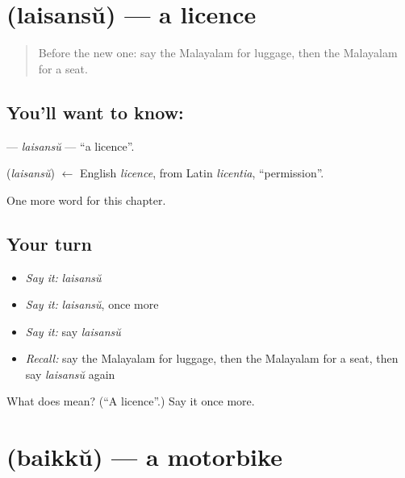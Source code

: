 \section[\texorpdfstring{\ml{ലൈസൻസ്} (laisansŭ)}{ലൈസൻസ് (laisansŭ)}]{ (laisansŭ) — a licence}

\label{lesson:ML-C210-laisansu}



\begin{quote}
Before the new one: say the Malayalam for luggage, then the Malayalam for a seat.
\end{quote}

\subsection*{You'll want to know: }
\textbf{} — \emph{laisansŭ} — \textquotedblleft{}a licence\textquotedblright{}.

\begin{cousinweb}
\textbf{} (\emph{laisansŭ}) $\leftarrow$ English \emph{licence}, from Latin \emph{licentia}, \textquotedblleft{}permission\textquotedblright{}.
\end{cousinweb}

\begin{grammarlens}[title={What you've built}]
One more word for this chapter.
\end{grammarlens}

\subsection*{Your turn}
\begin{itemize}
\raggedright
  \item \emph{Say it:} \emph{laisansŭ}
  \item \emph{Say it:} \emph{laisansŭ}, once more
  \item \emph{Say it:} say \emph{laisansŭ}
  \item \emph{Recall:} say the Malayalam for luggage, then the Malayalam for a seat, then say \emph{laisansŭ} again
\end{itemize}

\begin{tcolorbox}[breakable,colback=teal!4,colframe=teal!35!black,title={Before you move on}]
What does  mean? (\textquotedblleft{}A licence\textquotedblright{}.) Say it once more.
\end{tcolorbox}
\section[\texorpdfstring{\ml{ബൈക്ക്} (baikkŭ)}{ബൈക്ക് (baikkŭ)}]{ (baikkŭ) — a motorbike}

